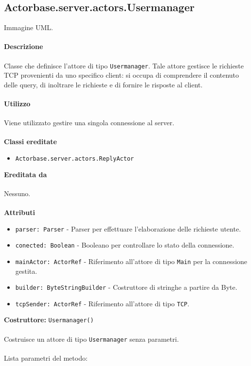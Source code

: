 \documentclass[a4paper]{article}
\begin{document}
	\subsection{Actorbase.server.actors.Usermanager}
		Immagine UML.
		\\ \\
		\textbf{Descrizione}
			\\ \\
			Classe che definisce l'attore di tipo \texttt{Usermanager}. Tale attore gestisce le richieste TCP provenienti da uno specifico client: si occupa di comprendere il contenuto delle query, di inoltrare le richieste e di fornire le risposte al client.
			\\ \\
		\textbf{Utilizzo}
			\\ \\
			Viene utilizzato gestire una singola connessione al server.
			\\ \\
		\textbf{Classi ereditate}
			\begin{itemize}
				\item \texttt{Actorbase.server.actors.ReplyActor}
			\end{itemize}
		\textbf{Ereditata da}
			\\ \\
			Nessuno.
			\\ \\
		\textbf{Attributi}
			\begin{itemize}
				\item \texttt{parser: Parser} - Parser per effettuare l'elaborazione delle richieste utente.
				\item \texttt{conected: Boolean} - Booleano per controllare lo stato della connessione.
				\item \texttt{mainActor: ActorRef} - Riferimento all'attore di tipo \texttt{Main} per la connessione gestita.
				\item \texttt{builder: ByteStringBuilder} - Costruttore di stringhe a partire da Byte.
				\item \texttt{tcpSender: ActorRef} - Riferimento all'attore di tipo \texttt{TCP}.
			\end{itemize}
		\textbf{Costruttore: }\texttt{Usermanager()}
			\\ \\
			Costruisce un attore di tipo \texttt{Usermanager} senza parametri.
			\\ \\
			Lista parametri del metodo:
\end{document}
